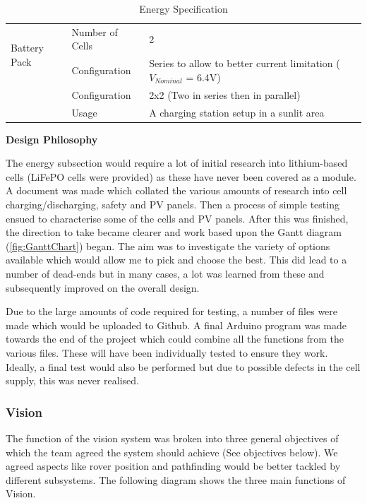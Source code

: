 \documentclass[10pt,twoside]{article}
\begin{document}
\begin{table}[htp]
\begin{tabular}{@{}cll@{}}
\multicolumn{1}{l}{\multirow{2}{*}{Battery Pack}} & Number of Cells   &  \parbox{0.61\linewidth}{2}           \\
                              & Configuration     & \parbox{0.61\linewidth}{Series to allow to better current limitation ($V_{Nominal}$ = 6.4V)}            \\ \midrule
{}                     & Configuration     &  \parbox{0.61\linewidth}{2x2 (Two in series then in parallel)}           \\ 
                                                  & Usage &
                                                  \parbox{0.61\linewidth}{A charging station setup in a sunlit area} \\ \bottomrule
\end{tabular}
\caption{\label{tab:EnergySpec} Energy Specification}
\end{table}

\textbf{Design Philosophy}

The energy subsection would require a lot of initial research into lithium-based cells (LiFePO cells were provided) as these have never been covered as a module. A document was made which collated the various amounts of research into cell charging/discharging, safety and PV panels. Then a process of simple testing ensued to characterise some of the cells and PV panels. After this was finished, the direction to take became clearer and work based upon the Gantt diagram (\ref{fig:GanttChart}) began. The aim was to investigate the variety of options available which would allow me to pick and choose the best. This did lead to a number of dead-ends but in many cases, a lot was learned from these and subsequently improved on the overall design.

Due to the large amounts of code required for testing, a number of files were made which would be uploaded to Github. A final Arduino program was made towards the end of the project which could combine all the functions from the various files. These will have been individually tested to ensure they work. Ideally, a final test would also be performed but due to possible defects in the cell supply, this was never realised.

\newpage


\subsubsection{Vision}
The function of the vision system was broken into three general objectives of which the team agreed the system should achieve (See objectives below). We agreed aspects like rover position and pathfinding would be better tackled by different subsystems. The following diagram shows the three main functions of Vision.
\end{document}
